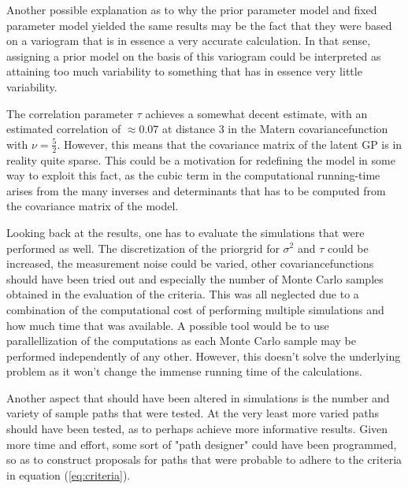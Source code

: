 Another possible explanation as to why the prior parameter model and fixed parameter model yielded the same results may be the fact that they were based on a variogram that is in essence a very accurate calculation. In that sense, assigning a prior model on the basis of this variogram could be interpreted as attaining too much variability to something that has in essence very little variability. 

The correlation parameter $\tau$ achieves a somewhat decent estimate, with an estimated correlation of $\approx 0.07$ at distance 3 in the Matern covariancefunction with $\nu=\frac{5}{2}$. However, this means that the covariance matrix of the latent GP is in reality quite sparse. This could be a motivation for redefining the model in some way to exploit this fact, as the cubic term in the computational running-time arises from the many inverses and determinants that has to be computed from the covariance matrix of the model. 

Looking back at the results, one has to evaluate the simulations that were performed as well. The discretization of the priorgrid for $\sigma^2$ and $\tau$ could be increased, the measurement noise could be varied, other covariancefunctions should have been tried out and especially the number of Monte Carlo samples obtained in the evaluation of the criteria. This was all neglected due to a combination of the computational cost of performing multiple simulations and how much time that was available. A possible tool would be to use parallellization of the computations as each Monte Carlo sample may be performed independently of any other. However, this doesn't solve the underlying problem as it won't change the immense running time of the calculations.

Another aspect that should have been altered in simulations is the number and variety of sample paths that were tested. At the very least more varied paths should have been tested, as to perhaps achieve more informative results. Given more time and effort, some sort of "path designer" could have been programmed, so as to construct proposals for paths that were probable to adhere to the criteria in equation (\ref{eq:criteria}).
